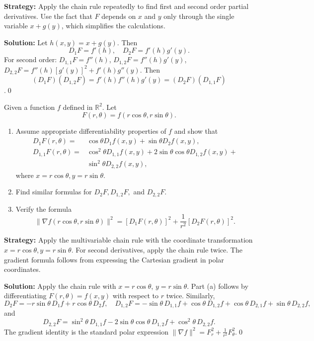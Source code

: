 \noindent\textbf{Strategy:} Apply the chain rule repeatedly to find first and second order partial derivatives. Use the fact that \( F \) depends on \( x \) and \( y \) only through the single variable \( x + g(y) \), which simplifies the calculations.

\bigskip\noindent\textbf{Solution:}
Let $h(x,y)=x+g(y)$. Then 
\[D_1F=f'(h),\quad D_2F=f'(h)g'(y).\] 
For second order: 
$D_{1,1}F=f''(h)$, $D_{1,2}F=f''(h)g'(y)$, $D_{2,2}F=f''(h)[g'(y)]^2+f'(h)g''(y)$. Then $$(D_1F)(D_{1,2}F)=f'(h)f''(h)g'(y)=(D_2F)(D_{1,1}F)$$.\qed


\begin{problembox}
\begin{problemstatement}
Given a function \( f \) defined in \( \mathbb{R}^2 \). Let
\[F(r, \theta) = f(r \cos \theta, r \sin \theta).\]
\begin{enumerate}[label=(\alph*)]
\item Assume appropriate differentiability properties of \( f \) and show that
\begin{align*}
D_1F(r, \theta) =& \cos \theta D_1f(x, y) + \sin \theta D_2f(x, y),\\
D_{1,1}F(r, \theta) =& \cos^2 \theta D_{1,1}f(x, y) + 2 \sin \theta \cos \theta D_{1,2}f(x, y) + \\
& \sin^2 \theta D_{2,2}f(x, y),
\end{align*}
where \( x = r \cos \theta, y = r \sin \theta \).
\item Find similar formulas for \( D_2F, D_{1,2}F, \) and \( D_{2,2}F \).
\item Verify the formula
\[\| \nabla f(r \cos \theta, r \sin \theta) \|^2 = [D_1F(r, \theta)]^2 + \frac{1}{r^2} [D_2F(r, \theta)]^2.\]
\end{enumerate}
\end{problemstatement}
\end{problembox}

\noindent\textbf{Strategy:} Apply the multivariable chain rule with the coordinate transformation \( x = r \cos \theta, y = r \sin \theta \). For second derivatives, apply the chain rule twice. The gradient formula follows from expressing the Cartesian gradient in polar coordinates.

\bigskip\noindent\textbf{Solution:}
Apply the chain rule with $x=r\cos\theta$, $y=r\sin\theta$. Part (a) follows by differentiating $F(r,\theta)=f(x,y)$ with respect to $r$ twice. Similarly,
\[D_2F=-r\sin\theta\,D_1f+r\cos\theta\,D_2f,\quad D_{1,2}F=-\sin\theta\,D_{1,1}f+\cos\theta\,D_{1,2}f+\cos\theta\,D_{2,1}f+\sin\theta\,D_{2,2}f,\]
and
\[D_{2,2}F=\sin^2\!\theta\,D_{1,1}f-2\sin\theta\cos\theta\,D_{1,2}f+\cos^2\!\theta\,D_{2,2}f.\]
The gradient identity is the standard polar expression $\|\nabla f\|^2=F_r^2+\tfrac{1}{r^2}F_\theta^2$.\qed


